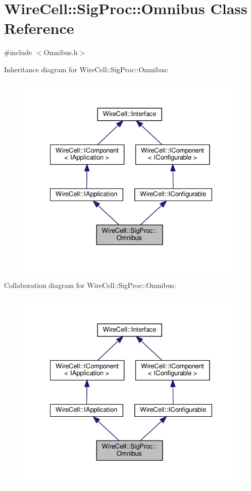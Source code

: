 \hypertarget{class_wire_cell_1_1_sig_proc_1_1_omnibus}{}\section{Wire\+Cell\+:\+:Sig\+Proc\+:\+:Omnibus Class Reference}
\label{class_wire_cell_1_1_sig_proc_1_1_omnibus}


{\ttfamily \#include $<$Omnibus.\+h$>$}



Inheritance diagram for Wire\+Cell\+:\+:Sig\+Proc\+:\+:Omnibus\+:
\nopagebreak
\begin{figure}[H]
\begin{center}
\leavevmode
\includegraphics[width=328pt]{class_wire_cell_1_1_sig_proc_1_1_omnibus__inherit__graph}
\end{center}
\end{figure}


Collaboration diagram for Wire\+Cell\+:\+:Sig\+Proc\+:\+:Omnibus\+:
\nopagebreak
\begin{figure}[H]
\begin{center}
\leavevmode
\includegraphics[width=328pt]{class_wire_cell_1_1_sig_proc_1_1_omnibus__coll__graph}
\end{center}
\end{figure}
